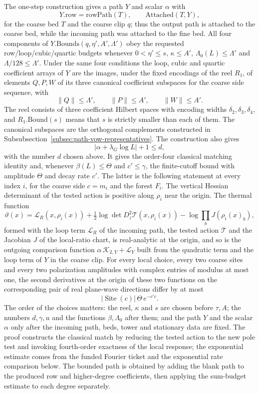 The one-step construction gives a path $Y$ and scalar $\alpha$ with
\[
 Y.\mathrm{row}=\mathrm{rowPath}(T),\qquad
 \mathrm{Attached}(T,Y),
\]
for the coarse bed $T$ and the coarse clip $q$; thus the output path is
attached to the coarse bed, while the incoming path was attached to the
fine bed. All four components of $Y.\mathrm{Bounds}(q,\eta',A',
\Lambda')$ obey the requested
row/loop/cubic/quartic budgets whenever
$0<\eta'\leq s$, $\kappa\leq A'$, $\Lambda_0(L)\leq\Lambda'$ and
$\Lambda/128\leq\Lambda'$. Under the same four conditions the loop,
cubic and quartic coefficient arrays of $Y$ are the images, under the
fixed encodings of the reel $R_1$, of elements $Q,P,W$ of its three
canonical coefficient subspaces for the coarse side sequence, with
\[
 \|Q\|\le\Lambda',\qquad\|P\|\le A',\qquad\|W\|\le A' .
\]
The reel consists of three coefficient Hilbert spaces with encoding
widths $\delta_2,\delta_3,\delta_4$, and $R_1.\mathrm{Bound}(s)$ means
that $s$ is strictly smaller than each of them. The canonical subspaces
are the orthogonal complements constructed in
Subsubsection~\ref{subsec:path-vow-representatives}. The construction also gives
\[
 |\alpha+\lambda_G\log L|+1\leq d,
\]
with the number $d$ chosen above.
It gives the order-four classical matching identity and, whenever
$\beta(L)\leq\Theta$ and $c'\leq\gamma$, the finite-cutoff bound with
amplitude $\Theta$ and decay rate $c'$. The latter is the following
statement at every index $i$, for the coarse side $c=m_i$ and the forest
$F_i$. The vertical Hessian determinant of the tested action is positive
along $\rho_i$ near the origin. The thermal function
\[
 \vartheta(x)=\mathcal L_R(x,\rho_i(x))
   +\tfrac12\log\det D_z^2\mathcal T(x,\rho_i(x))
   -\log\prod_b J(\rho_i(x)_b),
\]
formed with the loop term $\mathcal L_R$ of the incoming path, the
tested action $\mathcal T$ and the Jacobian $J$ of the local-ratio
chart, is real-analytic at the origin, and so is the outgoing
comparison function $\alpha\,\mathcal K_{2,Y}+\mathcal L_Y$ built from
the quadratic term and the loop term of $Y$ in the coarse clip. For
every local choice, every two coarse sites and every two polarization
amplitudes with complex entries of modulus at most one, the second
derivatives at the origin of these two functions on the corresponding
pair of real plane-wave directions differ by at most
\[
 |\operatorname{Site}(c)|\,\Theta\,e^{-c'c}.
\]
The order of the choices matters: the reel, $\kappa$ and $s$ are chosen
before $\tau,A$; the numbers $d,\gamma,u$ and the functions
$\beta,\Lambda_0$ after them; and the path $Y$ and the scalar $\alpha$
only after the incoming path, beds, tower and stationary data are
fixed. The proof constructs the classical
match by reducing the tested action to the new pole test and invoking
fourth-order exactness of the local response; the exponential estimate
comes from the funded Fourier ticket and the exponential rate comparison
below. The bounded path is obtained by adding the blank path to the produced
row and higher-degree coefficients, then applying the sum-budget estimate
to each degree separately.

